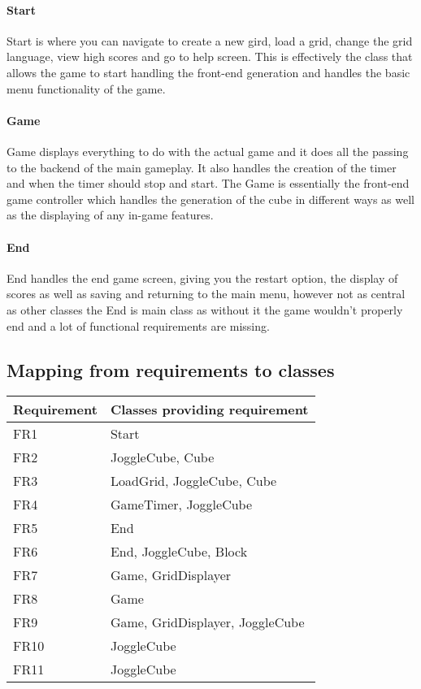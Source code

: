             \paragraph{Start}
            Start is where you can navigate to create a new gird, load a grid, change the grid language, view high scores and go to help screen. This is effectively the class that allows the game to start handling the front-end generation and handles the basic menu functionality of the game.
            \paragraph{Game}
            Game displays everything to do with the actual game and it does all the passing to the backend of the main gameplay. It also handles the creation of the timer and when the timer should stop and start. The Game is essentially the front-end game controller which handles the generation of the cube in different ways as well as the displaying of any in-game features.
            \paragraph{End}
            End handles the end game screen, giving you the restart option, the display of scores as well as saving and returning to the main menu, however not as central as other classes the End is main class as without it the game wouldn't properly end and a lot of functional requirements are missing.
	\subsection{Mapping from requirements to classes}
    	\begin{tabular}{|l|l|}
        	\hline
            Requirement & Classes providing requirement \\ \hline \hline
            FR1 &  Start\\ \hline
            FR2 & JoggleCube, Cube\\ \hline
            FR3 &  LoadGrid, JoggleCube, Cube\\\hline
            FR4 & GameTimer, JoggleCube\\ \hline
            FR5 & End\\ \hline
            FR6 & End, JoggleCube, Block\\ \hline
            FR7 & Game, GridDisplayer\\ \hline
            FR8 & Game\\ \hline
            FR9 & Game, GridDisplayer, JoggleCube\\ \hline
            FR10 & JoggleCube\\ \hline
            FR11 & JoggleCube\\ \hline
        \end{tabular}